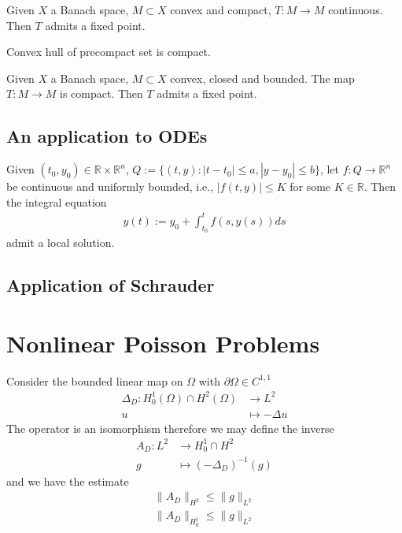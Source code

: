 \begin{theorem}
	Given $X$ a Banach space, $M \subset X$ convex and compact, $T: M \rightarrow M$ continuous. Then $T$ admits a fixed point. 
\end{theorem}

\begin{lemma}
	Convex hull of precompact set is compact. 
\end{lemma}

\begin{theorem}
	Given $X$ a Banach space, $M \subset X$ convex, closed and bounded. The map $T: M \rightarrow M$ is compact. Then $T$ admits a fixed point. 
\end{theorem}

\subsection{An application to ODEs}
\begin{theorem}[Peano]
Given $(t_0, y_0) \in \mathbb{R} \times \mathbb{R}^n$, $Q:= \{(t, y): |t - t_0| \le a, |y - y_0| \le b\}$, let $f: Q \rightarrow \mathbb{R}^n$ be continuous and uniformly bounded, i.e., $|f(t, y)| \le K$ for some $K \in \mathbb{R}$. Then the integral equation
\begin{align*}
	y(t):= y_0 + \int_{t_0}^t f(s, y(s)) ds 
\end{align*}
admit a local solution.	
\end{theorem}

\begin{corollary}
	
\end{corollary}


\subsection{Application of Schrauder}



\section{Nonlinear Poisson Problems}
\begin{lemma}
Consider the bounded linear map on $\Omega$ with $\partial\Omega \in C^{1, 1}$
\begin{align*}
	\Delta_D: H^1_0(\Omega) \cap H^2(\Omega) &\rightarrow L^2\\
	u &\mapsto -\Delta u
\end{align*}
The operator is an isomorphism therefore we may define the inverse
\begin{align*}
	A_D: L^2 &\rightarrow H^1_0 \cap H^2\\
	g &\mapsto (-\Delta_D)^{-1}(g)
\end{align*}
and we have the estimate
\begin{align*}
	\|A_D\|_{H^2} \le \|g\|_{L^2}\\
	\|A_D\|_{H^1_0} \le \|g\|_{L^2}
\end{align*}
\end{lemma}


